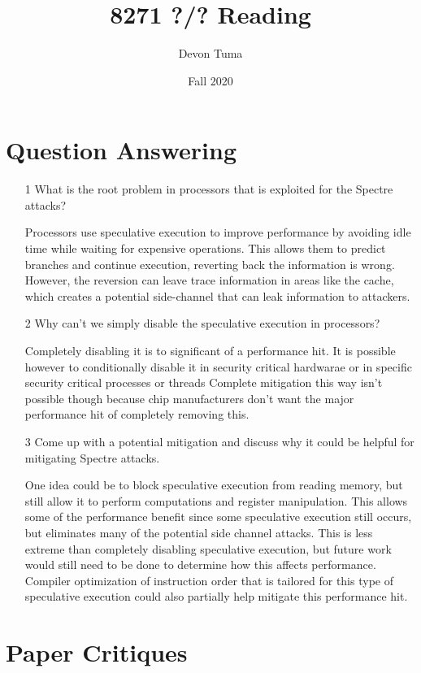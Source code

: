 \documentclass[11pt]{article}
\title{8271 ?/? Reading}
\author{Devon Tuma}
\date{Fall 2020}
\begin{document}
\maketitle

\section*{Question Answering}

\begin{itemize}
\item [1] What is the root problem in processors that is exploited for the Spectre attacks?

  Processors use speculative execution to improve performance by avoiding idle time while waiting for expensive operations.
  This allows them to predict branches and continue execution, reverting back the information is wrong.
  However, the reversion can leave trace information in areas like the cache, which creates a potential side-channel that can leak information to attackers.
  
\item[2] Why can't we simply disable the speculative execution in processors?

  Completely disabling it is to significant of a performance hit.
  It is possible however to conditionally disable it in security critical hardwarae or in specific security critical processes or threads
  Complete mitigation this way isn't possible though because chip manufacturers don't want the major performance hit of completely removing this.

\item[3] Come up with a potential mitigation and discuss why it could be helpful for mitigating Spectre attacks.

  One idea could be to block speculative execution from reading memory, but still allow it to perform computations and register manipulation.
  This allows some of the performance benefit since some speculative execution still occurs, but eliminates many of the potential side channel attacks.
  This is less extreme than completely disabling speculative execution, but future work would still need to be done to determine how this affects performance.
  Compiler optimization of instruction order that is tailored for this type of speculative execution could also partially help mitigate this performance hit.
  
\end{itemize}

\section*{Paper Critiques}
\end{document}
